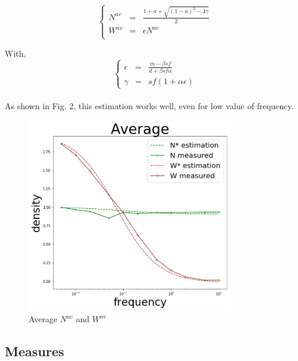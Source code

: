 \documentclass{article}
\begin{document}
\[
\left\lbrace
\begin{array}{rcl}
N^{av} & = & \frac{1+a+\sqrt{(1-a)^2-4\gamma}}{2} \\
W^{av} & = & \epsilon N^{av} \\
\end{array}
\right.
\]

With,
\[
\left\lbrace
\begin{array}{rcl}
\epsilon & = & \frac{m-\beta s f}{d + \beta s f \alpha} \\
\gamma & = & sf(1+\alpha\epsilon)
\end{array}
\right.
\]

\paragraph{}
As shown in Fig. 2, this estimation works well, even for low value of frequency.

\begin{figure}[h!]
\centering
\includegraphics[width=9cm]{average.png}
\caption{Average $N^{av}$ and $W^{av}$}
\end{figure}





\newpage
\subsection{Measures}
\end{document}
